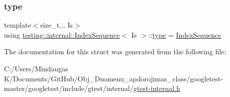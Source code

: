 \mbox{\label{structtesting_1_1internal_1_1_index_sequence_a89bb13a7b5d169b69659f395dcec2b2d}} 
\subsubsection{\texorpdfstring{type}{type}\hspace{0.1cm}{\footnotesize\ttfamily [2/2]}}
{\footnotesize\ttfamily template$<$size\+\_\+t... Is$>$ \\
using \mbox{\hyperlink{structtesting_1_1internal_1_1_index_sequence}{testing\+::internal\+::\+Index\+Sequence}}$<$ Is $>$\+::\mbox{\hyperlink{structtesting_1_1internal_1_1_index_sequence_a89bb13a7b5d169b69659f395dcec2b2d}{type}} =  \mbox{\hyperlink{structtesting_1_1internal_1_1_index_sequence}{Index\+Sequence}}}



The documentation for this struct was generated from the following file\+:\begin{DoxyCompactItemize}
\item 
C\+:/\+Users/\+Mindaugas K/\+Documents/\+Git\+Hub/\+Obj\+\_\+\+Duomenu\+\_\+apdorojimas\+\_\+class/googletest-\/master/googletest/include/gtest/internal/\mbox{\hyperlink{googletest-master_2googletest_2include_2gtest_2internal_2gtest-internal_8h}{gtest-\/internal.\+h}}\end{DoxyCompactItemize}
